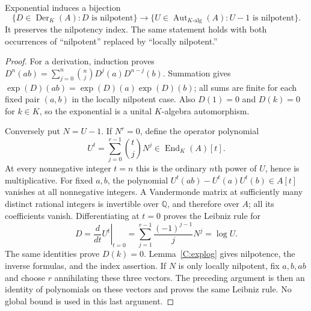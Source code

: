 \begin{theorem}
\label{C:unipotent}
Exponential induces a bijection
\[
\{D\in\operatorname{Der}_K(A):D\text{ is nilpotent}\}
\longrightarrow
\{U\in\operatorname{Aut}_{K\text{-alg}}(A):U-1\text{ is nilpotent}\}.
\]
It preserves the nilpotency index. The same statement holds with both occurrences of ``nilpotent'' replaced by ``locally nilpotent.''
\end{theorem}
\begin{proof}
For a derivation, induction proves
$D^n(ab)=\sum_{j=0}^n\binom njD^j(a)D^{n-j}(b)$.
Summation gives $\exp(D)(ab)=\exp(D)(a)\exp(D)(b)$; all sums are finite for each fixed pair $(a,b)$ in the locally nilpotent case. Also $D(1)=0$ and $D(k)=0$ for $k\in K$, so the exponential is a unital $K$-algebra automorphism.

Conversely put $N=U-1$. If $N^r=0$, define the operator polynomial
\[
U^t=\sum_{j=0}^{r-1}\binom tjN^j\in\operatorname{End}_K(A)[t].
\]
At every nonnegative integer $t=n$ this is the ordinary $n$th power of $U$, hence is multiplicative. For fixed $a,b$, the polynomial $U^t(ab)-U^t(a)U^t(b)\in A[t]$ vanishes at all nonnegative integers. A Vandermonde matrix at sufficiently many distinct rational integers is invertible over $\mathbb Q$, and therefore over $A$; all its coefficients vanish. Differentiating at $t=0$ proves the Leibniz rule for
\[
D=\left.\frac{d}{dt}U^t\right|_{t=0}
 =\sum_{j=1}^{r-1}\frac{(-1)^{j-1}}jN^j=\log U.
\]
The same identities prove $D(k)=0$. Lemma~\ref{C:explog} gives nilpotence, the inverse formulas, and the index assertion. If $N$ is only locally nilpotent, fix $a,b,ab$ and choose $r$ annihilating these three vectors. The preceding argument is then an identity of polynomials on these vectors and proves the same Leibniz rule. No global bound is used in this last argument.
\end{proof}

